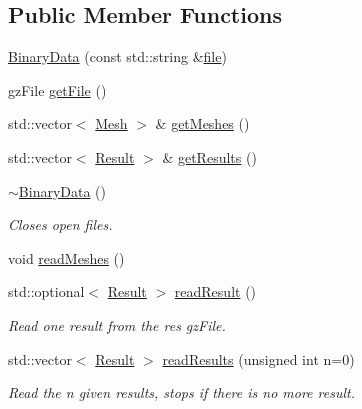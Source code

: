 \subsection*{Public Member Functions}
\begin{DoxyCompactItemize}
\item 
\hyperlink{classBinaryData_a0bba582d92f95dc186e3c36ea9ddcd36}{Binary\+Data} (const std\+::string \&\hyperlink{classBinaryData_a9eae74bdf3b91a3e1461802d820591e3}{file})
\item 
gz\+File \hyperlink{classBinaryData_a20d3521069ee75c21b83de91ddf5c44b}{get\+File} ()
\item 
std\+::vector$<$ \hyperlink{classMesh}{Mesh} $>$ \& \hyperlink{classBinaryData_ac2baca71c75e2ea6d12ed89d265dfb6f}{get\+Meshes} ()
\item 
std\+::vector$<$ \hyperlink{classResult}{Result} $>$ \& \hyperlink{classBinaryData_a33f15e0f1b9c34d286e84bc615e7a83e}{get\+Results} ()
\item 
\hyperlink{classBinaryData_a31499383f285646922658e87866a73ea}{$\sim$\+Binary\+Data} ()
\begin{DoxyCompactList}\small\item\em Closes open files. \end{DoxyCompactList}\item 
void \hyperlink{classBinaryData_a11126f35f2b4f20edc1f3c36f549fb10}{read\+Meshes} ()
\item 
std\+::optional$<$ \hyperlink{classResult}{Result} $>$ \hyperlink{classBinaryData_aa2fad71246ba4648b6f9d2045fd4201e}{read\+Result} ()
\begin{DoxyCompactList}\small\item\em Read one result from the res gz\+File. \end{DoxyCompactList}\item 
std\+::vector$<$ \hyperlink{classResult}{Result} $>$ \hyperlink{classBinaryData_a0faec96c84437c29694d2e54689b7f07}{read\+Results} (unsigned int n=0)
\begin{DoxyCompactList}\small\item\em Read the n given results, stops if there is no more result. \end{DoxyCompactList}\end{DoxyCompactItemize}
